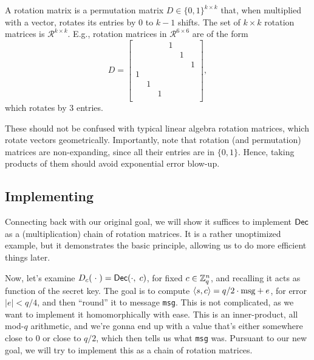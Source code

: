 \documentclass[11pt]{article}
\begin{document}
\begin{definition}
    \label{def:rot-mat}
    A rotation matrix is a permutation matrix $D \in \{0,1\}^{k \times k}$ that, when multiplied with a vector, rotates its entries by $0$ to $k-1$ shifts. \noindent The set of $k\times k$ rotation matrices is $\mathcal{R}^{k \times k}$. E.g., rotation matrices in $\mathcal{R}^{6 \times 6}$ are of the form
    $$D = \begin{bmatrix}
         &  &   & 1 &   &  \\
         &  &   &   & 1 &  \\
         &  &   &   &   & 1 \\
       1 &  &   &   &   &  \\
         &1 &   &   &   &  \\
         &  & 1 &   &   &  \\
    \end{bmatrix},$$
    which rotates by 3 entries. 

\end{definition}

\noindent These should not be confused with typical linear algebra rotation matrices, which rotate vectors geometrically. Importantly, note that rotation (and permutation) matrices are non-expanding, since all their entries are in $\{0,1\}$. Hence, taking products of them should avoid exponential error blow-up.

\subsection{Implementing \skcdec}

Connecting back with our original goal, we will show it suffices to implement $\mathsf{Dec}$ as a (multiplication) chain of rotation matrices. It is a rather unoptimized example, but it demonstrates the basic principle, allowing us to do more efficient things later.

Now, let's examine $D_c(\;\cdot\;)=\mathsf{Dec}(\cdot, \; c)$, for fixed $c \in \mathbb{Z}^n_q$, and recalling it acts as function of the secret key. The goal is to compute $\langle s, c \rangle = q/2 \cdot \textmd{msg} + e$, for error $|e|<q/4$, and then ``round'' it to message \texttt{msg}. This is not complicated, as we want to implement it homomorphically with ease. This is an inner-product, all mod-$q$ arithmetic, and we're gonna end up with a value that's either somewhere close to $0$ or close to $q/2$, which then tells us what \texttt{msg} was. Pursuant to our new goal, we will try to implement this as a chain of rotation matrices.
\end{document}
